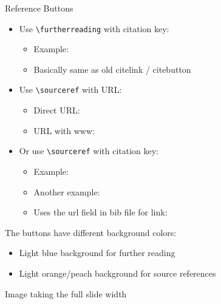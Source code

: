 \documentclass[11pt,compress,t,notes=noshow, xcolor=table]{beamer}
\begin{document}
\begin{frame}{Reference Buttons }
  
  \begin{itemize}
    \item Use \texttt{\textbackslash furtherreading} with citation key:
    \begin{itemize}
      \item Example: 
      \item Basically same as old citelink / citebutton
    \end{itemize}
    
    \item Use \texttt{\textbackslash sourceref} with URL:
    \begin{itemize}
      \item Direct URL: 
      \item URL with www: 
    \end{itemize}
    
    \item Or use \texttt{\textbackslash sourceref} with citation key:
    \begin{itemize}
      \item Example: 
      \item Another example: 
      \item Uses the url field in bib file for link:
    \end{itemize}
  \end{itemize}
  
  \vspace{1em}
  The buttons have different background colors:
  \begin{itemize}
    \item Light blue background for further reading
    \item Light orange/peach background for source references
  \end{itemize}
  
\end{frame}



\begin{frame}{Image taking the full slide width}
\end{frame}
\end{document}
